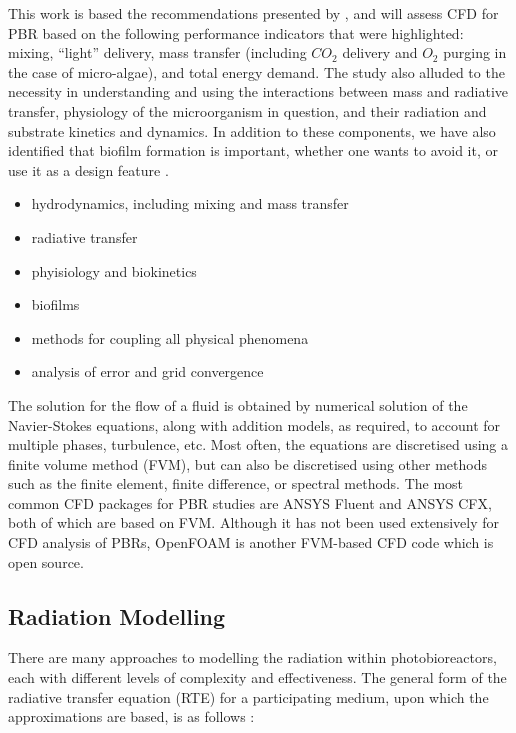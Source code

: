 This work is based the recommendations presented by \cite{posten2009}, and will assess CFD for PBR based on the following performance indicators that were highlighted: mixing, ``light'' delivery, mass transfer (including $CO_2$ delivery and $O_2$ purging in the case of micro-algae), and total energy demand. The study also alluded to the necessity in understanding and using the interactions between mass and radiative transfer, physiology of the microorganism in question, and their radiation and substrate kinetics and dynamics. In addition to these components, we have also identified that biofilm formation is important, whether one wants to avoid it, or use it as a design feature \cite{castro2017}.

\begin{itemize}
\item hydrodynamics, including mixing and mass transfer
\item radiative transfer
\item phyisiology and biokinetics
\item biofilms
\item methods for coupling all physical phenomena
\item analysis of error and grid convergence
\end{itemize}

The solution for the flow of a fluid is obtained by numerical solution of the Navier-Stokes equations, along with addition models, as required, to account for multiple phases, turbulence, etc. Most often, the equations are discretised using a finite volume method (FVM), but can also be discretised using other methods such as the finite element, finite difference, or spectral methods.  The most common CFD packages for PBR studies are ANSYS Fluent and ANSYS CFX, both of which are based on FVM.  Although it has not been used extensively for CFD analysis of PBRs, OpenFOAM is another FVM-based CFD code which is open source.


\subsection{Radiation Modelling}
\label{S:radiation}
There are many approaches to modelling the radiation within photobioreactors, each with different levels of complexity and effectiveness. The general form of the radiative transfer equation (RTE) for a participating medium, upon which the approximations are based, is as follows \cite{modest2003}:

